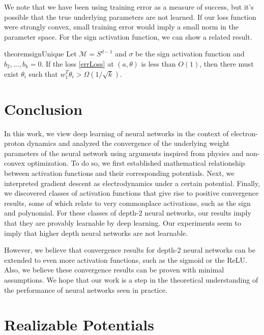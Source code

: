 \documentclass{article}
\begin{document}
We note that we have been using training error as a measure of success, but it's possible that the true underlying parameters are not learned. If our loss function were strongly convex, small training error would imply a small norm in the parameter space. For the sign activation function, we can show a related result.

\begin{restatable}{theorem}{signUnique}
\label{SignUnique}
Let $\mathcal{M} = S^{d-1}$ and $\sigma$ be the sign activation function and $b_2,...,b_k = 0$. If the loss \eqref{errLoss} at $(a,\theta)$ is less than $O(1)$, then there must exist $\theta_i$ such that $w_1^T\theta_i > \Omega(1/\sqrt{k})$.
\end{restatable}



\section{Conclusion}

In this work, we view deep learning of neural networks in the context of electron-proton dynamics and analyzed the convergence of the underlying weight parameters of the neural network using arguments inspired from physics and non-convex optimization. To do so, we first established mathematical relationship between activation functions and their corresponding potentials. Next, we interpreted gradient descent as electrodynamics under a certain potential. Finally, we discovered classes of activation functions that give rise to positive convergence results, some of which relate to very commonplace activations, such as the sign and polynomial. For these classes of depth-2 neural networks, our results imply that they are provably learnable by deep learning. Our experiments seem to imply that higher depth neural networks are not learnable. 

However, we believe that convergence results for depth-2 neural networks can be extended to even more activation functions, such as the sigmoid or the ReLU. Also, we believe these convergence results can be proven with minimal assumptions. We hope that our work is a step in the theoretical understanding of the performance of neural networks seen in practice.







\newpage
\appendix


\section{Realizable Potentials}
\label{realizable}
\end{document}
